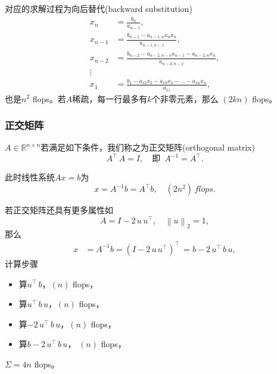 对应的求解过程为向后替代(backward substitution)
\begin{equation*}
\begin{split}
    x_{n} & = \frac{b_{n}}{a_{n-1}}, \\
    x_{n-1} & = \frac{
    b_{n-1} - a_{n-1,n} x_{n} x_{n}
    }{
    a_{n-1,n-1}
    }, \\
    x_{n-2} & = \frac{
    b_{n-2} - a_{n-2,n-1} x_{n-1} - a_{n-2,n} x_{n}
    }{
    a_{n-2,n-2}
    }, \\
    \vdots & \\
    x_{1} & = \frac{
    b_{1} - a_{12}x_{2} - a_{13}x_{3} - \ldots - a_{1n}x_{n}
    }{
    a_{11}
    },
\end{split}
\end{equation*}
也是$n^{2}$ flops。若$A$稀疏，每一行最多有$k$个非零元素，那么 $\left(2 kn \right)$ flops。

\subsubsection{正交矩阵}
\label{sec:numlin-matrix-orthogonality}
$A \in \mathbb{R}^{n \times n}$若满足如下条件，我们称之为正交矩阵(orthogonal matrix)
\begin{equation*}
  A^{\top} \, A = I, \quad \text{即 } \, A^{-1} = A^{\top}.
\end{equation*}

此时线性系统$A x = b$为
\begin{equation*}
  x = A^{-1} b = A^{\top} b, \quad \left( 2n^{2} \right) \, flops.
\end{equation*}

若正交矩阵还具有更多属性如
\begin{equation*}
  A = I - 2 \, u \, u^{\top}, \quad \left\| u \right\|_{2} = 1,
\end{equation*}
那么
\begin{equation*}
  \begin{split}
    x & = A^{-1} b = \left( I - 2 \, u \, u^{\top} \right)^{\top} \,
    = b - 2 \, u^{\top} \, b \, u,
    \end{split}
\end{equation*}
计算步骤
\begin{itemize}
  \item 算$u^{\top} \, b$，$\left( n \right)$ flops，
  \item 算$u^{\top} \, b \, u $，$\left( n \right)$ flops，
  \item 算$-2 \, u^{\top} \, b \, u $，$\left( n \right)$ flops，
  \item 算$b - 2 \, u^{\top} \, b \, u$， $\left( n \right)$ flops，
\end{itemize}
$\Sigma = 4n$ flops。

